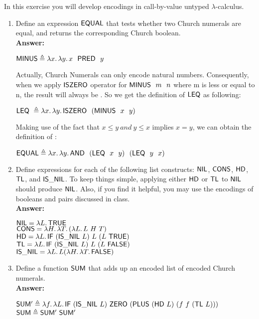 \documentclass[11pt]{article}
\begin{document}
\begin{exercise}
In this exercise you will develop encodings in call-by-value untyped
$\lambda$-calculus.
\begin{enumerate}
\item Define an expression $\mathsf{EQUAL}$ that tests whether two Church numerals 
  are equal, and returns the corresponding Church boolean.\\

\noindent \textbf{Answer:}
\begin{center}
	$\nm{MINUS} \triangleq \lam{x}{\lam{y}{x \ \ \nm{PRED} \ \ y}}$\\
\end{center}
\noindent Actually, Church Numerals can only encode natural numbers. Consequently, when we apply $\mathsf{ISZERO}$ operator for $\mathsf{MINUS} \ \ m \ \ n$ where m is less or equal to n, the result will always be . So we get the definition of $\mathsf{LEQ}$ as following:
\begin{center}
	$\mathsf{LEQ} \ \triangleq \lambda x.\,\lambda y.\,\mathsf{ISZERO} \ \ (\mathsf{MINUS} \ \ x \ \ y)$\\
\end{center}
\noindent Making use of the fact that $x \leq y \ and \ y \leq x$ implies $x = y$, we can obtain the definition of :
\begin{center}
	$\mathsf{EQUAL} \triangleq \lambda x.\,\lambda y.\,\mathsf{AND} \ \ (\mathsf{LEQ} \ \ x \ \ y) \ \ (\mathsf{LEQ} \ \ y \ \ x)$
\end{center}
\item Define expressions for each of the
  following list constructs: $\mathsf{NIL}$, $\mathsf{CONS}$, $\mathsf{HD}$,
  $\mathsf{TL}$, and $\mathsf{IS\_NIL}$. To keep things simple, applying
  either $\mathsf{HD}$ or $\mathsf{TL}$ to $\mathsf{NIL}$ should produce
  $\mathsf{NIL}$. Also, if you find it helpful, you may use the encodings
  of booleans and pairs discussed in class.\\

\noindent \textbf{Answer:}
\begin{center}
	$\mathsf{NIL} = \lambda L.\,\mathsf{TRUE}$\\
	$\mathsf{CONS} = \lambda H.\,\lambda T.\,(\lambda L.\,L~H~T)$\\
	$\mathsf{HD} = \lambda L.\,\mathsf{IF}~(\mathsf{IS\_NIL}~L)~L~(L~\mathsf{TRUE})$\\
	$\mathsf{TL} = \lambda L.\,\mathsf{IF}~(\mathsf{IS\_NIL}~L)~L~(L~\mathsf{FALSE})$\\
	$\mathsf{IS\_NIL} = \lambda L.\,L(\lambda H.\,\lambda T.\,\mathsf{FALSE})$
\end{center}
\item Define a function $\mathsf{SUM}$ that adds up an encoded list of encoded Church
  numerals.\\

\noindent \textbf{Answer:}
\begin{center}
	$\mathsf{SUM'} \triangleq \lambda f.\,\lambda L.\,\mathsf{IF}~(\mathsf{IS\_NIL}~L)~\mathsf{ZERO}~(\mathsf{PLUS}~(\mathsf{HD}~L)~(f~f~(\mathsf{TL}~L)))$\\
	$\mathsf{SUM} \triangleq \mathsf{SUM'}~\mathsf{SUM'}$
\end{center}
\end{enumerate}
\end{exercise}
\end{document}
